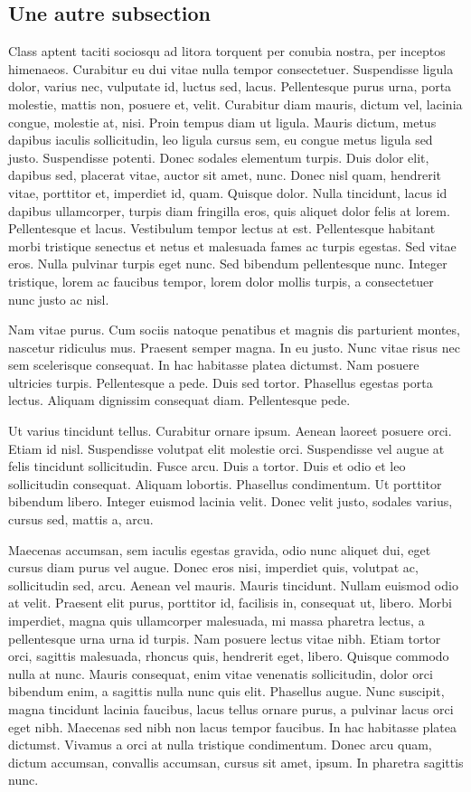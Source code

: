 \documentclass[../hdr.tex]{subfiles}
\begin{document}
\subsection*{Une autre subsection}

Class aptent taciti sociosqu ad litora torquent per conubia nostra, per inceptos
himenaeos. Curabitur eu dui vitae nulla tempor consectetuer. Suspendisse ligula
dolor, varius nec, vulputate id, luctus sed, lacus. Pellentesque purus urna,
porta molestie, mattis non, posuere et, velit. Curabitur diam mauris, dictum
vel, lacinia congue, molestie at, nisi. Proin tempus diam ut ligula. Mauris
dictum, metus dapibus iaculis sollicitudin, leo ligula cursus sem, eu congue
metus ligula sed justo. Suspendisse potenti. Donec sodales elementum turpis.
Duis dolor elit, dapibus sed, placerat vitae, auctor sit amet, nunc. Donec nisl
quam, hendrerit vitae, porttitor et, imperdiet id, quam. Quisque dolor. Nulla
tincidunt, lacus id dapibus ullamcorper, turpis diam fringilla eros, quis
aliquet dolor felis at lorem. Pellentesque et lacus. Vestibulum tempor lectus at
est. Pellentesque habitant morbi tristique senectus et netus et malesuada fames
ac turpis egestas. Sed vitae eros. Nulla pulvinar turpis eget nunc. Sed bibendum
pellentesque nunc. Integer tristique, lorem ac faucibus tempor, lorem dolor
mollis turpis, a consectetuer nunc justo ac nisl.

Nam vitae purus. Cum sociis natoque penatibus et magnis dis parturient montes,
nascetur ridiculus mus. Praesent semper magna. In eu justo. Nunc vitae risus nec
sem scelerisque consequat. In hac habitasse platea dictumst. Nam posuere
ultricies turpis. Pellentesque a pede. Duis sed tortor. Phasellus egestas porta
lectus. Aliquam dignissim consequat diam. Pellentesque pede.

Ut varius tincidunt tellus. Curabitur ornare ipsum. Aenean laoreet posuere orci.
Etiam id nisl. Suspendisse volutpat elit molestie orci. Suspendisse vel augue at
felis tincidunt sollicitudin. Fusce arcu. Duis a tortor. Duis et odio et leo
sollicitudin consequat. Aliquam lobortis. Phasellus condimentum. Ut porttitor
bibendum libero. Integer euismod lacinia velit. Donec velit justo, sodales
varius, cursus sed, mattis a, arcu.

Maecenas accumsan, sem iaculis egestas gravida, odio nunc aliquet dui, eget
cursus diam purus vel augue. Donec eros nisi, imperdiet quis, volutpat ac,
sollicitudin sed, arcu. Aenean vel mauris. Mauris tincidunt. Nullam euismod odio
at velit. Praesent elit purus, porttitor id, facilisis in, consequat ut, libero.
Morbi imperdiet, magna quis ullamcorper malesuada, mi massa pharetra lectus, a
pellentesque urna urna id turpis. Nam posuere lectus vitae nibh. Etiam tortor
orci, sagittis malesuada, rhoncus quis, hendrerit eget, libero. Quisque commodo
nulla at nunc. Mauris consequat, enim vitae venenatis sollicitudin, dolor orci
bibendum enim, a sagittis nulla nunc quis elit. Phasellus augue. Nunc suscipit,
magna tincidunt lacinia faucibus, lacus tellus ornare purus, a pulvinar lacus
orci eget nibh. Maecenas sed nibh non lacus tempor faucibus. In hac habitasse
platea dictumst. Vivamus a orci at nulla tristique condimentum. Donec arcu quam,
dictum accumsan, convallis accumsan, cursus sit amet, ipsum. In pharetra
sagittis nunc.
\end{document}
